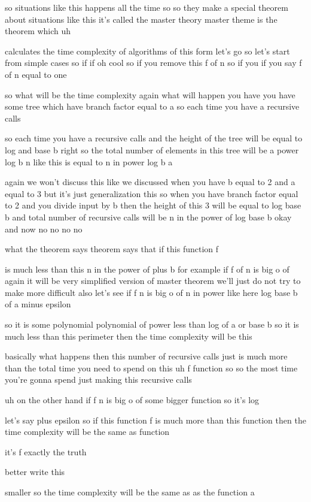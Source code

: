 so situations like this happens all the time so so they make a special theorem about situations like this it's called the master theory master theme is the theorem which uh

calculates the time complexity of algorithms of this form let's go so let's start from simple cases so if if oh cool so if you remove this f of n so if you if you say f of n equal to one

so what will be the time complexity again what will happen you have you have some tree which have branch factor equal to a so each time you have a recursive calls

so each time you have a recursive calls and the height of the tree will be equal to log and base b right so the total number of elements in this tree will be a power log b n like this is equal to n in power log b a

again we won't discuss this like we discussed when you have b equal to 2 and a equal to 3 but it's just generalization this so when you have branch factor equal to 2 and you divide input by b then the height of this 3 will be equal to log base b and total number of recursive calls will be n in the power of log base b okay and now no no no no

what the theorem says theorem says that if this function f

is much less than this n in the power of plus b for example if f of n is big o of again it will be very simplified version of master theorem we'll just do not try to make more difficult also let's see if f n is big o of n in power like here log base b of a minus epsilon

so it is some polynomial polynomial of power less than log of a or base b so it is much less than this perimeter then the time complexity will be this

basically what happens then this number of recursive calls just is much more than the total time you need to spend on this uh f function so so the most time you're gonna spend just making this recursive calls

uh on the other hand if f n is big o of some bigger function so it's log

let's say plus epsilon so if this function f is much more than this function then the time complexity will be the same as function

it's f exactly the truth

better write this

smaller so the time complexity will be the same as as the function a

